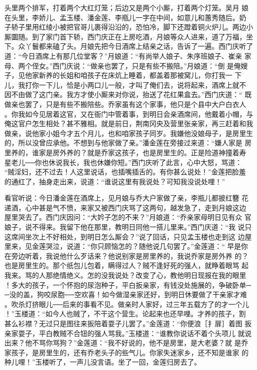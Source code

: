头里两个排军，打着两个大红灯笼；后边又是两个小厮，打着两个灯笼。吴月
娘在头里，李娇儿、孟玉楼、潘金莲、李瓶儿一字在中间，如意儿和蕙秀随后。奶
子轿子里用红绫小被把官哥儿裹得沿沿的，恐怕冷，脚下还蹬着铜火炉儿。两边小
厮圜随。到了家门首下轿，西门庆正在上房吃酒，月娘等众人进来，道了万福，坐
下。众丫鬟都来磕了头。月娘先把今日酒席上结亲之话，告诉了一遍。西门庆听了
道：“今日酒席上有那几位堂客？”月娘道：“有尚举人娘子、朱序班娘子、崔亲
家母、两个侄女。”西门庆说：“做亲也罢了，只是有些不搬陪。”月娘道：“倒
是俺嫂子，见他家新养的长姐和咱孩子在床炕上睡着，都盖着那被窝儿，你打我一
下儿，我打你一下儿，恰是小两口儿一般，才叫了俺们去，说将起来，酒席上就不
因不由做了这门亲。我方才使小厮来对你说，抬送了花红果盒去。”西门庆道：“
既做亲也罢了，只是有些不搬陪些。乔家虽有这个家事，他只是个县中大户白衣人
。你我如今见居着这官，又在衙门中管着事，到明日会亲酒席间，他戴着小帽，与
俺这官户怎生相处？甚不雅相。就是前日，荆南冈央及营里张亲家，再三赶着和我
做亲，说他家小姐今才五个月儿，也和咱家孩子同岁。我嫌他没娘母子，是房里生
的，所以没曾应承他。不想到与他家做了亲。”潘金莲在旁接过来道：“嫌人家是
房里养的，谁家是房外养的？就是乔家这孩子，也是房里生的。正是险道神撞着寿
星老儿──你也休说我长，我也休嫌你短。”西门庆听了此言，心中大怒，骂道：
“贼淫妇，还不过去！人这里说话，也插嘴插舌的。有你甚么说处！”金莲把脸羞
的通红了，抽身走出来，说道：“谁说这里有我说处？可知我没说处哩！”

看官听说：今日潘金莲在酒席上，见月娘与乔大户家做了亲，李瓶儿都披红簪
花递酒，心中甚是气不愤，来家又被西门庆骂了这两句，越发急了，走到月娘这边
屋里哭去了。西门庆因问：“大妗子怎的不来？”月娘道：“乔亲家母明日见有众
官娘子，说不得来。我留下他在那里，教明日同他一搭儿里来。”西门庆道：“我
说只这席间坐次上不好相处，到明日怎么厮会？”说了回话，只见孟玉楼也走到这
边屋里来，见金莲哭泣，说道：“你只顾恼怎的？随他说几句罢了。”金莲道：“
早是你在旁边听着，我说他什么歹话来？他说别家是房里养的，我说乔家是房外养
的？也是房里生的。那个纸包儿包着，瞒得过人？贼不逢好死的强人，就睁着眼骂
起我来。骂的人那绝情绝义。怎的没我说处？改变了心，教他明日现报在我的眼里
！多大的孩子，一个怀抱的尿泡种子，平白扳亲家，有钱没处施展的，争破卧单─
─没的盖，狗咬尿胞──空欢喜！如今做湿亲家还好，到明日休要做了干亲家才难
。吹杀灯挤眼儿──后来的事看不见。做亲时人家好，过三年五载方了的才一个儿
！”玉楼道：“如今人也贼了，不干这个营生。论起来也还早哩。才养的孩子，割
甚么衫襟？无过只是图往来扳陪着耍子儿罢了。”金莲道：“你便浪［扌扉］着图
扳亲家耍子，平白教贼不合钮的强人骂我。”玉楼道：“谁教你说话不着个头项儿
就说出来？他不骂你骂狗？”金莲道：“我不好说的，他不是房里，是大老婆？就
是乔家孩子，是房里生的，还有乔老头子的些气儿。你家失迷家乡，还不知是谁家
的种儿哩！”玉楼听了，一声儿没言语。坐了一回，金莲归房去了。

